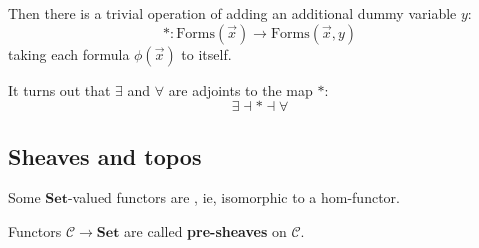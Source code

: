 Then there is a trivial operation of adding an additional dummy variable $y$:
\begin{equation}
* : \mbox{Forms}(\vec{x}) \rightarrow \mbox{Forms}(\vec{x}, y)
\end{equation}
taking each formula $\phi(\vec{x})$ to itself.

It turns out that $\exists$ and $\forall$ are adjoints to the map $*$:
\begin{equation}
 \exists \dashv * \dashv \forall
\end{equation}

\subsection{Sheaves and topos}

Some $\mathbf{Set}$-valued functors are , ie, isomorphic to a hom-functor.

Functors $\mathcal{C} \rightarrow \mathbf{Set}$ are called \textbf{pre-sheaves} on $\mathcal{C}$.

